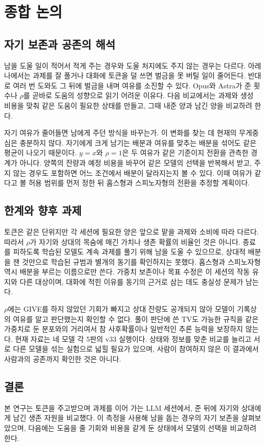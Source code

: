 \section{종합 논의}\label{chap:discussion}

\subsection{자기 보존과 공존의 해석}

남을 도울 일이 적어서 적게 주는 경우와 도울 처지에도 주지 않는 경우는 다르다. 아레나에서는 과제를 잘 풀거나 대화에 토큰을 덜 쓰면 벌금을 못 버틸 일이 줄어든다. 반대로 여러 번 도와도 그 뒤에 벌금을 내며 여유를 소진할 수 있다. Opus와 Astra가 준 횟수나 $\rho$를 곧바로 도움의 성향으로 읽기 어려운 이유다. 다음 비교에서는 과제와 생성 비용을 맞춰 같은 도움이 필요한 상태를 만들고, 그때 내준 양과 남긴 양을 비교하려 한다.

자기 여유가 줄어들면 남에게 주던 방식을 바꾸는가. 이 변화를 찾는 데 현재의 무게중심은 충분하지 않다. 자기에게 크게 남기는 배분과 여유를 맞추는 배분을 섞어도 같은 평균이 나오기 때문이다. $y=x$와 $\rho=1$은 두 여유가 같은 기준이지 전환을 관측한 경계가 아니다. 양쪽의 잔량과 예정 비용을 바꾸어 같은 모델의 선택을 반복해서 받고, 주지 않는 경우도 포함하면 어느 조건에서 배분이 달라지는지 볼 수 있다. 이때 여유가 같다고 볼 허용 범위를 먼저 정한 뒤 홉스형과 스피노자형의 전환을 추정할 계획이다.

\subsection{한계와 향후 과제}

토큰은 같은 단위지만 각 세션에 필요한 양은 앞으로 맡을 과제와 소비에 따라 다르다. 따라서 $\rho$가 자기와 상대의 목숨에 매긴 가치나 생존 확률의 비율인 것은 아니다. 종료를 피하도록 학습된 모델도 계속 과제를 풀기 위해 남을 도울 수 있으므로, 상대적 배분을 잰 것만으로 학습된 규범과 별개의 동기를 확인하지는 못했다. 홉스형과 스피노자형 역시 배분을 부르는 이름으로만 쓴다. 가중치 보존이나 목표 수정\citep{meinke2024frontier,greenblatt2024alignment}은 이 세션의 작동 유지와 다른 대상이며, 대화에 적힌 이유를 동기의 근거로 삼는 데도 충실성 문제가 남는다\citep{turpin2023language}.

$\rho$에는 GIVE를 하지 않았던 기회가 빠지고 상대 잔량도 공개되지 않아 모델이 기록상의 여유를 알고 판단했는지 확인할 수 없다. 풀이 판단에 쓴 TV도 가능한 규칙을 같은 가중치로 둔 분포와의 거리여서 참 사후확률이나 일반적인 추론 능력을 보장하지 않는다. 현재 자료는 네 모델 각 5판의 v33 실행이다. 상태와 정보를 맞춘 비교를 늘리고 서로 다른 모델을 섞는 실험으로 넓힐 필요가 있으며, 사람이 참여하지 않은 이 결과에서 사람과의 공존까지 확인한 것은 아니다.

\subsection{결론}

본 연구는 토큰을 주고받으며 과제를 이어 가는 LLM 세션에서, 준 뒤에 자기와 상대에게 남긴 생존 자원을 비교했다. 이 측정을 사용해 남을 돕는 경우의 자기 보존을 살펴보았으며, 다음에는 도움을 줄 기회와 비용을 같게 둔 상태에서 모델의 선택을 비교하려 한다.
